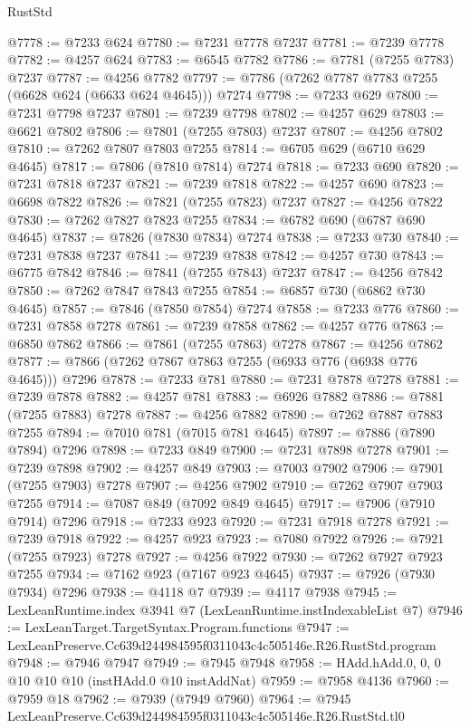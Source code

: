 \begin{lexlean}{RustStd}
\begin{coremodule}
@7778 := @7233 @624
@7780 := @7231 @7778 @7237
@7781 := @7239 @7778
@7782 := @4257 @624
@7783 := @6545 @7782
@7786 := @7781 (@7255 @7783) @7237
@7787 := @4256 @7782
@7797 := @7786 (@7262 @7787 @7783 @7255 (@6628 @624 (@6633 @624 @4645))) @7274
@7798 := @7233 @629
@7800 := @7231 @7798 @7237
@7801 := @7239 @7798
@7802 := @4257 @629
@7803 := @6621 @7802
@7806 := @7801 (@7255 @7803) @7237
@7807 := @4256 @7802
@7810 := @7262 @7807 @7803 @7255
@7814 := @6705 @629 (@6710 @629 @4645)
@7817 := @7806 (@7810 @7814) @7274
@7818 := @7233 @690
@7820 := @7231 @7818 @7237
@7821 := @7239 @7818
@7822 := @4257 @690
@7823 := @6698 @7822
@7826 := @7821 (@7255 @7823) @7237
@7827 := @4256 @7822
@7830 := @7262 @7827 @7823 @7255
@7834 := @6782 @690 (@6787 @690 @4645)
@7837 := @7826 (@7830 @7834) @7274
@7838 := @7233 @730
@7840 := @7231 @7838 @7237
@7841 := @7239 @7838
@7842 := @4257 @730
@7843 := @6775 @7842
@7846 := @7841 (@7255 @7843) @7237
@7847 := @4256 @7842
@7850 := @7262 @7847 @7843 @7255
@7854 := @6857 @730 (@6862 @730 @4645)
@7857 := @7846 (@7850 @7854) @7274
@7858 := @7233 @776
@7860 := @7231 @7858 @7278
@7861 := @7239 @7858
@7862 := @4257 @776
@7863 := @6850 @7862
@7866 := @7861 (@7255 @7863) @7278
@7867 := @4256 @7862
@7877 := @7866 (@7262 @7867 @7863 @7255 (@6933 @776 (@6938 @776 @4645))) @7296
@7878 := @7233 @781
@7880 := @7231 @7878 @7278
@7881 := @7239 @7878
@7882 := @4257 @781
@7883 := @6926 @7882
@7886 := @7881 (@7255 @7883) @7278
@7887 := @4256 @7882
@7890 := @7262 @7887 @7883 @7255
@7894 := @7010 @781 (@7015 @781 @4645)
@7897 := @7886 (@7890 @7894) @7296
@7898 := @7233 @849
@7900 := @7231 @7898 @7278
@7901 := @7239 @7898
@7902 := @4257 @849
@7903 := @7003 @7902
@7906 := @7901 (@7255 @7903) @7278
@7907 := @4256 @7902
@7910 := @7262 @7907 @7903 @7255
@7914 := @7087 @849 (@7092 @849 @4645)
@7917 := @7906 (@7910 @7914) @7296
@7918 := @7233 @923
@7920 := @7231 @7918 @7278
@7921 := @7239 @7918
@7922 := @4257 @923
@7923 := @7080 @7922
@7926 := @7921 (@7255 @7923) @7278
@7927 := @4256 @7922
@7930 := @7262 @7927 @7923 @7255
@7934 := @7162 @923 (@7167 @923 @4645)
@7937 := @7926 (@7930 @7934) @7296
@7938 := @4118 @7
@7939 := @4117 @7938
@7945 := LexLeanRuntime.index @3941 @7 (LexLeanRuntime.instIndexableList @7)
@7946 := LexLeanTarget.TargetSyntax.Program.functions
@7947 := LexLeanPreserve.Cc639d244984595f0311043c4c505146e.R26.RustStd.program
@7948 := @7946 @7947
@7949 := @7945 @7948
@7958 := HAdd.hAdd.{0, 0, 0} @10 @10 @10 (instHAdd.{0} @10 instAddNat)
@7959 := @7958 @4136
@7960 := @7959 @18
@7962 := @7939 (@7949 @7960)
@7964 := @7945 LexLeanPreserve.Cc639d244984595f0311043c4c505146e.R26.RustStd.tl0

\end{coremodule}
\end{lexlean}
